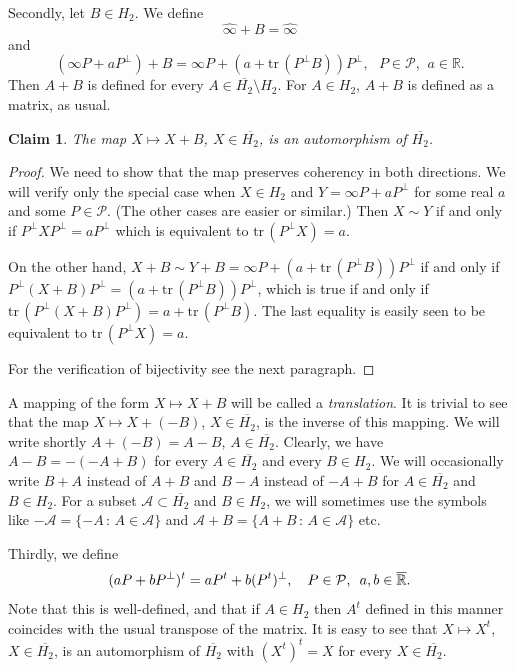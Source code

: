 \documentclass[10pt]{amsart}
\newtheorem{claim}[theorem]{Claim}
\theoremstyle{definition}
\theoremstyle{remark}
\numberwithin{subsection}{section}
\numberwithin{equation}{section}
\newcommand\oH{{\overline{H_2}}}
\newcommand\oi{{\widehat{\infty}}}
\newcommand\oR{{\overline{\mathbb{R}}}}
\begin{document}
Secondly, let $B \in H_2$. We define
\[
{\oi} +B = {\oi}
\]
and
\[
( \infty P + aP^{\perp}) + B =  \infty P + ( a + \mathrm{tr}\, (P^\perp B) )P^{\perp}  , \ \ \ P\in \mathcal{P}, \ \, a \in \mathbb{R}.
\]
Then $A+B$  is defined for every $A\in \oH\setminus H_2$.
For $A\in H_2$, $A+B$ is defined as a matrix, as usual.
\begin{claim}
The map $X \mapsto X + B$, $X \in \oH$, is an automorphism of $\oH$. 
\end{claim}
\begin{proof}
We need to show that the map preserves coherency in both directions. We will verify only the special case when $X \in H_2$ and $Y =  \infty P + aP^{\perp}$ for some real $a$ and some $P \in \mathcal{P}$. (The other cases are easier or similar.) Then $X \sim Y$ if and only if $P ^\perp X P ^\perp = a P ^\perp$ which is equivalent to $\mathrm{tr}\, (P ^\perp X) = a$.

On the other hand, $ X + B \sim Y+ B = \infty P + (a + \mathrm{tr}\,( P^{\perp} B)) P^\perp$ if and only if $P ^\perp (X+B) P ^\perp = (a + \mathrm{tr}\, (P^{\perp} B)) P^\perp$, which is true if and only if $\mathrm{tr}\, ( P ^\perp (X+B) P ^\perp ) = a + \mathrm{tr}\, (P^{\perp} B)$. The last equality is easily seen to be equivalent to $\mathrm{tr}\, (P ^\perp X) = a$.

For the verification of bijectivity see the next paragraph.
\end{proof}

A mapping of the form $X\mapsto X+B$ will be called a \emph{translation}. 
It is trivial to see that the map $X \mapsto X + (- B)$, $X \in \oH$, is the inverse of this mapping. 
We will write shortly $A + (-B) = A-B$, $A \in \oH$. Clearly, we have $A-B = - (-A + B)$ for every $A \in \oH$ and every $B \in H_2$.
We will occasionally write $B+A$ instead of $A+ B$ and $B-A$ instead of $-A+ B$ for $A \in \oH$ and $B \in H_2$. For a subset $\mathcal{A}\subset \oH$ and $B\in H_2$, we will sometimes use the symbols like $-\mathcal{A}=\{-A\,:\, A\in \mathcal{A}\}$ and $\mathcal{A}+B=\{A+B\,:\, A\in \mathcal{A}\}$ etc.
 
Thirdly, we define
\[
( a P + bP^{\perp})^t =  a P^t +  b (P^t)^{\perp}  , \ \ \ P\in \mathcal{P}, \ \,a,b\in \oR. \index{$A^t$}
\]
Note that this is well-defined, and that if $A\in H_2$ then $A^t$ defined in this manner coincides with the usual transpose of the matrix.
It is easy to see that $X \mapsto X^t$, $X \in \oH$, is an automorphism of $\oH$ with $(X^t)^t = X$ for every $X \in \oH$.
\end{document}

